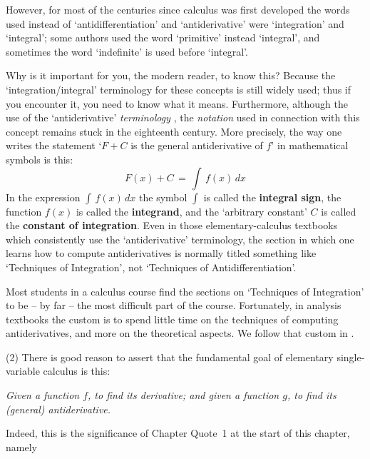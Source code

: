 {    However, for most of the centuries since calculus was first developed the words used instead of `antidifferentiation' and `antiderivative' were 
    `integration' and `integral'; some authors used the word `primitive' instead `integral', and sometimes the word `indefinite' is used before `integral'.

        Why is it important for you, the modern reader, to know this? Because the `integration/integral' terminology for these concepts is still widely used;
    thus if you encounter it, you need to know what it means. Furthermore, although the use of the `antiderivative' {\em terminology} ,
    the {\em notation} used in connection with this concept remains stuck in the eighteenth century.
    More precisely, the way one writes the statement `$F+C$ is the general antiderivative of $f$' in mathematical symbols is this:
        \begin{displaymath}
        F(x)+C \,=\, \int\, f(x)\,dx
        \end{displaymath}
    In the expression ${\displaystyle \int\, f(x)\,dx}$ the symbol ${\displaystyle \int}$ is called the {\bf integral sign},
    the function $f(x)$ is called the {\bf integrand}, and the `arbitrary constant' $C$ is called the {\bf constant of integration}.
    Even in those elementary-calculus textbooks which consistently use the `antiderivative' terminology,
     the section in which one learns how to compute antiderivatives is normally titled something like `Techniques of Integration',
    not `Techniques of Antidifferentiation'.

        Most students in a calculus course find the sections on `Techniques of Integration' to be -- by far -- the most difficult part of the course.
    Fortunately, in analysis textbooks the custom is to spend little time on the techniques of computing antiderivatives,
    and more on the theoretical aspects. We follow that custom in {\ThisText}.

\V

        (2) There is good reason to assert that the fundamental goal of elementary single-variable calculus is this:

\VA

    \h {\em Given a function $f$, to find its derivative;
    and given a function $g$, to find its (general) antiderivative.}

\VA

\noindent Indeed, this is the significance of Chapter Quote~{1} at the start of this chapter, namely 

}
